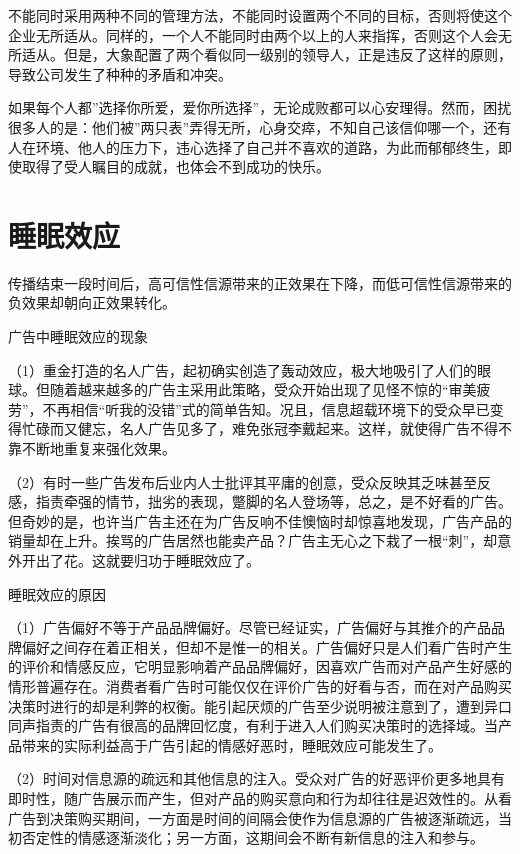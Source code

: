 \documentclass[11pt]{ctexart}
\begin{document}
不能同时采用两种不同的管理方法，不能同时设置两个不同的目标，否则将使这个企业无所适从。同样的，一个人不能同时由两个以上的人来指挥，否则这个人会无所适从。但是，大象配置了两个看似同一级别的领导人，正是违反了这样的原则，导致公司发生了种种的矛盾和冲突。

如果每个人都''选择你所爱，爱你所选择''，无论成败都可以心安理得。然而，困扰很多人的是：他们被''两只表''弄得无所，心身交瘁，不知自己该信仰哪一个，还有人在环境、他人的压力下，违心选择了自己并不喜欢的道路，为此而郁郁终生，即使取得了受人瞩目的成就，也体会不到成功的快乐。
\section{睡眠效应}
\label{sec-90}


传播结束一段时间后，高可信性信源带来的正效果在下降，而低可信性信源带来的负效果却朝向正效果转化。

广告中睡眠效应的现象

（1）重金打造的名人广告，起初确实创造了轰动效应，极大地吸引了人们的眼球。但随着越来越多的广告主采用此策略，受众开始出现了见怪不惊的“审美疲劳”，不再相信“听我的没错”式的简单告知。况且，信息超载环境下的受众早已变得忙碌而又健忘，名人广告见多了，难免张冠李戴起来。这样，就使得广告不得不靠不断地重复来强化效果。

（2）有时一些广告发布后业内人士批评其平庸的创意，受众反映其乏味甚至反感，指责牵强的情节，拙劣的表现，蹩脚的名人登场等，总之，是不好看的广告。但奇妙的是，也许当广告主还在为广告反响不佳懊恼时却惊喜地发现，广告产品的销量却在上升。挨骂的广告居然也能卖产品？广告主无心之下栽了一根“刺”，却意外开出了花。这就要归功于睡眠效应了。

睡眠效应的原因

（1）广告偏好不等于产品品牌偏好。尽管已经证实，广告偏好与其推介的产品品牌偏好之间存在着正相关，但却不是惟一的相关。广告偏好只是人们看广告时产生的评价和情感反应，它明显影响着产品品牌偏好，因喜欢广告而对产品产生好感的情形普遍存在。消费者看广告时可能仅仅在评价广告的好看与否，而在对产品购买决策时进行的却是利弊的权衡。能引起厌烦的广告至少说明被注意到了，遭到异口同声指责的广告有很高的品牌回忆度，有利于进入人们购买决策时的选择域。当产品带来的实际利益高于广告引起的情感好恶时，睡眠效应可能发生了。

（2）时间对信息源的疏远和其他信息的注入。受众对广告的好恶评价更多地具有即时性，随广告展示而产生，但对产品的购买意向和行为却往往是迟效性的。从看广告到决策购买期间，一方面是时间的间隔会使作为信息源的广告被逐渐疏远，当初否定性的情感逐渐淡化；另一方面，这期间会不断有新信息的注入和参与。
\end{document}
